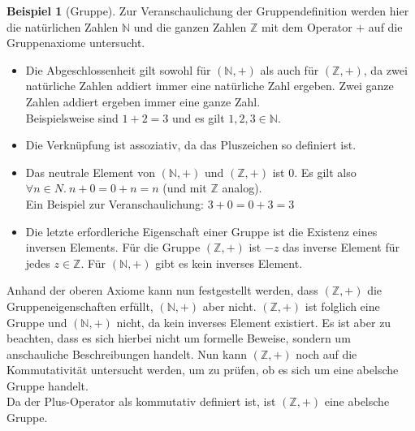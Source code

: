 \documentclass[12pt,a4paper, usenames, dvipsnames]{article}
\theoremstyle{mystyle}
\theoremstyle{definition}
\newtheorem{bsp}{Beispiel}[definition]
\begin{document}
\begin{bsp}[Gruppe]

Zur Veranschaulichung der Gruppendefinition werden hier die natürlichen Zahlen $\mathbb{N}$ und die ganzen Zahlen $\mathbb{Z}$ mit dem Operator $+$ auf die Gruppenaxiome untersucht.
\begin{itemize}
\item Die Abgeschlossenheit gilt sowohl für $(\mathbb{N},+)$ als auch für $(\mathbb{Z},+)$, da zwei natürliche Zahlen addiert immer eine natürliche Zahl ergeben. Zwei ganze Zahlen addiert ergeben immer eine ganze Zahl. \\
Beispielsweise sind $1+2=3$ und es gilt $1,2,3 \in \mathbb{N}$.
\item Die Verknüpfung ist assoziativ, da das Pluszeichen so definiert ist.
\item Das neutrale Element von $(\mathbb{N},+)$ und $(\mathbb{Z},+)$ ist $0$. Es gilt also $\forall n \in N. \ n + 0 = 0 + n = n$ (und mit $\mathbb{Z}$ analog). \\
Ein Beispiel zur Veranschaulichung: $3+0=0+3=3$
\item Die letzte erfordleriche Eigenschaft einer Gruppe ist die Existenz eines inversen Elements. Für die Gruppe $(\mathbb{Z},+)$ ist $-z$ das inverse Element für jedes $z \in \mathbb{Z}$. Für $(\mathbb{N},+)$ gibt es kein inverses Element.
\end{itemize}
Anhand der oberen Axiome kann nun festgestellt werden, dass $(\mathbb{Z},+)$ die Gruppeneigenschaften erfüllt, $(\mathbb{N},+)$ aber nicht. 
$(\mathbb{Z},+)$ ist folglich eine Gruppe und $(\mathbb{N},+)$ nicht, da kein inverses Element existiert. 
Es ist aber zu beachten, dass es sich hierbei nicht um formelle Beweise, sondern um anschauliche Beschreibungen handelt.
Nun kann $(\mathbb{Z},+)$ noch auf die Kommutativität untersucht werden, um zu prüfen, ob es sich um eine abelsche Gruppe handelt. \\
Da der Plus-Operator als kommutativ definiert ist, ist $(\mathbb{Z},+)$ eine abelsche Gruppe.

\end{bsp}
\end{document}
